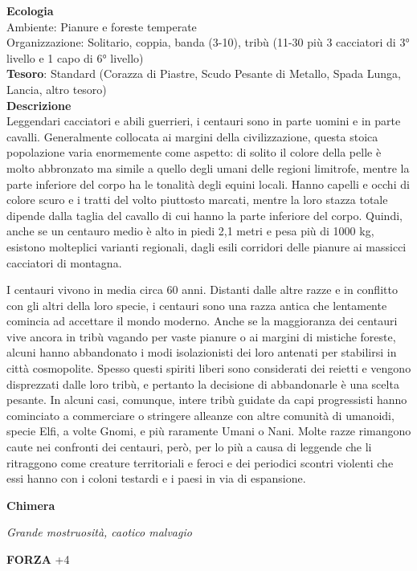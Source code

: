 \begin{multicols}{2}
\textbf{Ecologia}\\
Ambiente: Pianure e foreste temperate\\
Organizzazione: Solitario, coppia, banda (3-10), tribù (11-30 più 3 cacciatori di 3° livello e 1 capo di 6° livello)\\
\textbf{Tesoro}: Standard (Corazza di Piastre, Scudo Pesante di Metallo, Spada Lunga, Lancia, altro tesoro)\\
\textbf{Descrizione}\\
Leggendari cacciatori e abili guerrieri, i centauri sono in parte uomini e in parte cavalli. Generalmente collocata ai margini della civilizzazione, questa stoica popolazione varia enormemente come aspetto: di solito il colore della pelle è molto abbronzato ma simile a quello degli umani delle regioni limitrofe, mentre la parte inferiore del corpo ha le tonalità degli equini locali. Hanno capelli e occhi di colore scuro e i tratti del volto piuttosto marcati, mentre la loro stazza totale dipende dalla taglia del cavallo di cui hanno la parte inferiore del corpo. Quindi, anche se un centauro medio è alto in piedi 2,1 metri e pesa più di 1000 kg, esistono molteplici varianti regionali, dagli esili corridori delle pianure ai massicci cacciatori di montagna.

I centauri vivono in media circa 60 anni. Distanti dalle altre razze e in conflitto con gli altri della loro specie, i centauri sono una razza antica che lentamente comincia ad accettare il mondo moderno. Anche se la maggioranza dei centauri vive ancora in tribù vagando per vaste pianure o ai margini di mistiche foreste, alcuni hanno abbandonato i modi isolazionisti dei loro antenati per stabilirsi in città cosmopolite. Spesso questi spiriti liberi sono considerati dei reietti e vengono disprezzati dalle loro tribù, e pertanto la decisione di abbandonarle è una scelta pesante. In alcuni casi, comunque, intere tribù guidate da capi progressisti hanno cominciato a commerciare o stringere alleanze con altre comunità di umanoidi, specie Elfi, a volte Gnomi, e più raramente Umani o Nani. Molte razze rimangono caute nei confronti dei centauri, però, per lo più a causa di leggende che li ritraggono come creature territoriali e feroci e dei periodici scontri violenti che essi hanno con i coloni testardi e i paesi in via di espansione.

\medskip{}\textbf{Chimera}

\textit{Grande mostruosità, caotico malvagio}

\textbf{FORZA} +4


\end{multicols}
